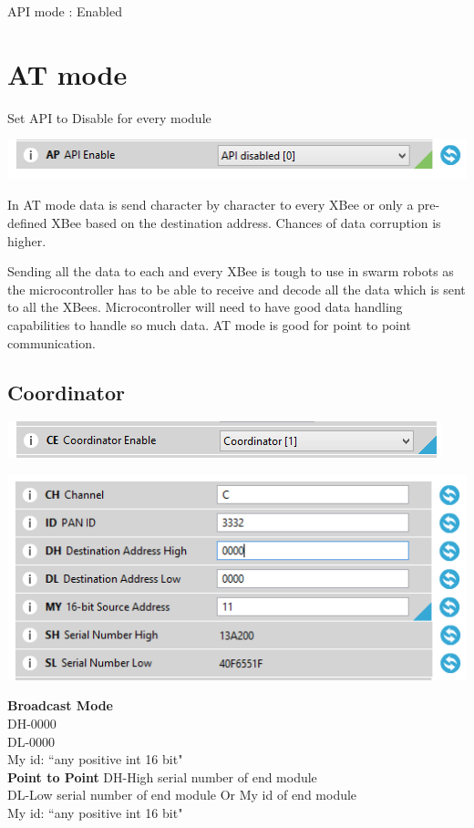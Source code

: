 \documentclass[main.tex]{subfiles}
\begin{document}
API mode : Enabled
\pagebreak
\section{AT mode}
Set API to Disable for every module

\noindent\includegraphics[scale=1]{Images/apidisable.png}

In AT mode data is send character by character to every XBee or only a pre-defined XBee based on the destination address.
Chances of data corruption is higher. 

Sending all the data to each and every XBee is tough to use in swarm robots as the microcontroller has to be able to receive and decode all the data which is sent to all the XBees. 
Microcontroller will need to have good data handling capabilities to handle so much data.
AT mode is good for point to point communication.

\pagebreak
\subsection{Coordinator}
\includegraphics[scale=1]{Images/corenb.png}

\includegraphics[scale=1]{Images/atcord.png}

\noindent\textbf{Broadcast Mode}\\
DH-0000\\ 
DL-0000 \\
My id: ``any positive int 16 bit"\\

\noindent\textbf{Point to Point}
DH-High serial number of end module\\ 
DL-Low serial number of end module Or My id of end module\\
My id: ``any positive int 16 bit"
\end{document}

